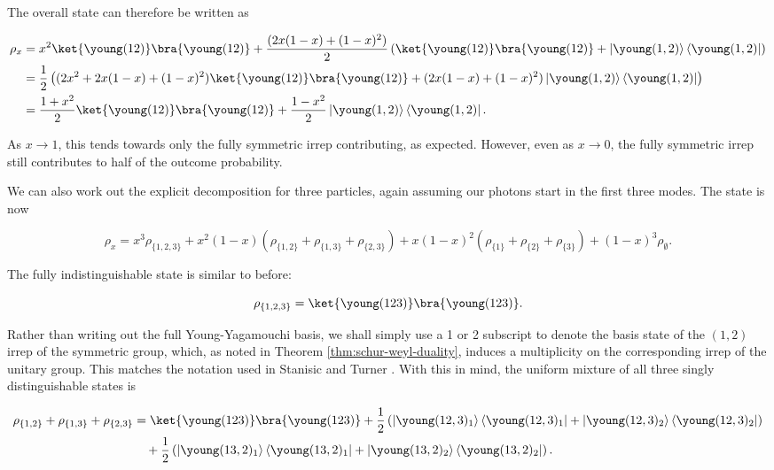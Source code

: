 The overall state can therefore be written as

\begin{align}
\rho_x &= x^2\ket{\young(12)}\bra{\young(12)} + \frac{(2x(1-x)+(1-x)^2)}{2}\left(\ket{\young(12)}\bra{\young(12)}+\left|\young(1,2)\right\rangle\left\langle\young(1,2)\right|\right)\\
&= \frac{1}{2}\left((2x^2 + 2x(1-x)+(1-x)^2)\ket{\young(12)}\bra{\young(12)}+(2x(1-x)+(1-x)^2)\left|\young(1,2)\right\rangle\left\langle\young(1,2)\right|\right)\\
&= \frac{1+x^2}{2}\ket{\young(12)}\bra{\young(12)}+\frac{1-x^2}{2}\left|\young(1,2)\right\rangle\left\langle\young(1,2)\right|.
\end{align}

As $x\rightarrow 1$, this tends towards only the fully symmetric irrep contributing, as expected. However, even as $x\rightarrow 0$, the fully symmetric irrep still contributes to half of the outcome probability.

We can also work out the explicit decomposition for three particles, again assuming our photons start in the first three modes. The state is now

\begin{equation}
\rho_x = x^3\rho_{\{1,2,3\}} + x^2(1-x)(\rho_{\{1,2\}}+\rho_{\{1,3\}}+\rho_{\{2,3\}}) + x(1-x)^2(\rho_{\{1\}}+\rho_{\{2\}}+\rho_{\{3\}}) + (1-x)^3\rho_\emptyset.
\end{equation}

The fully indistinguishable state is similar to before:

\begin{equation}
\rho_{\{1,2,3\}} = \ket{\young(123)}\bra{\young(123)}.
\end{equation}

Rather than writing out the full Young-Yagamouchi basis, we shall simply use a 1 or 2 subscript to denote the basis state of the $(1,2)$ irrep of the symmetric group, which, as noted in Theorem \ref{thm:schur-weyl-duality}, induces a multiplicity on the corresponding irrep of the unitary group. This matches the notation used in Stanisic and Turner \cite{stanisic2018}. With this in mind, the uniform mixture of all three singly distinguishable states is

\begin{align}
\rho_{\{1,2\}}+\rho_{\{1,3\}}+\rho_{\{2,3\}} &= \ket{\young(123)}\bra{\young(123)} + \frac{1}{2}\left(\left|\young(12,3)_1\right\rangle\left\langle\young(12,3)_1\right| + \left|\young(12,3)_2\right\rangle\left\langle\young(12,3)_2\right|\right)\nonumber\\
&\quad+ \frac{1}{2}\left(\left|\young(13,2)_1\right\rangle\left\langle\young(13,2)_1\right| + \left|\young(13,2)_2\right\rangle\left\langle\young(13,2)_2\right|\right).
\end{align}

